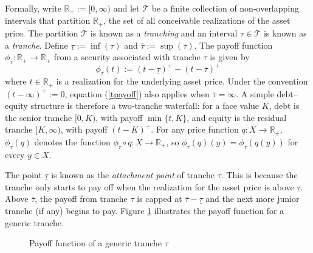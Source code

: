 \documentclass[11pt]{article}
\theoremstyle{plain}
\begin{document}
Formally, write $\mathbb{R}_+:=[0,\infty)$ and let $\mathcal{T}$ be a finite collection of non-overlapping intervals that partition $\mathbb{R}_+$, the set of all conceivable realizations of the asset price. The partition $\mathcal{T}$ is known as a \textit{tranching} and an interval $\tau\in \mathcal{T}$ is known as a \textit{tranche}. Define $\underline{\tau}:=\inf(\tau)$ and $\overline{\tau}:=\sup(\tau)$. The payoff function
$\phi_\tau:\mathbb{R}_+\to\mathbb{R}_+$ from a security associated with tranche $\tau$ is given by
\begin{equation}\label{tpayoff}
\phi_\tau(t):=(t-\underline{\tau})^+-(t-\overline{\tau})^+
\end{equation}
where $t\in\mathbb{R}_+$
is a realization for the underlying asset price.
Under the convention $(t-\infty)^+:=0$, equation (\ref{tpayoff}) also applies when $\overline{\tau}=\infty$.
A simple debt--equity structure is therefore a two-tranche waterfall: for a face value $K$, debt is the senior tranche $[0,K)$, with payoff $\min\{t,K\}$, and equity is the residual tranche $[K,\infty)$, with payoff $(t-K)^+$.
For any price function $q:X\to\mathbb{R}_+$, $\phi_\tau(q)$ denotes the function $\phi_\tau\circ q:X\to\mathbb{R}_+$, so $\phi_\tau(q)(y)=\phi_\tau(q(y))$ for every $y\in X$.

The point $\underline{\tau}$ is known as the \textit{attachment point} of tranche $\tau$. This is because the tranche only starts to pay off when the realization for the asset price is above $\underline{\tau}$. Above $\overline{\tau}$, the payoff from tranche $\tau$ is capped at $\overline{\tau}-\underline{\tau}$ and the next more junior tranche (if any) begins to pay. Figure \ref{fig:pay} illustrates the payoff function for a generic tranche.

\begin{figure}[h]
\centering
{}
\caption{Payoff function of a generic tranche $\tau$}
\label{fig:pay}
\end{figure}
\end{document}
